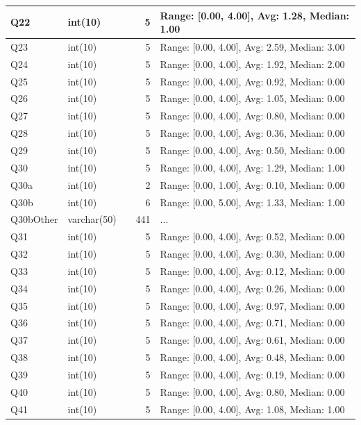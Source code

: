 \begin{landscape}
\begin{longtable}{|l|l|l|r|p{6cm}|}
\hline
Q22 & int(10) &  & 5 & Range: [0.00, 4.00], Avg: 1.28, Median: 1.00 \\
\hline
Q23 & int(10) &  & 5 & Range: [0.00, 4.00], Avg: 2.59, Median: 3.00 \\
\hline
Q24 & int(10) &  & 5 & Range: [0.00, 4.00], Avg: 1.92, Median: 2.00 \\
\hline
Q25 & int(10) &  & 5 & Range: [0.00, 4.00], Avg: 0.92, Median: 0.00 \\
\hline
Q26 & int(10) &  & 5 & Range: [0.00, 4.00], Avg: 1.05, Median: 0.00 \\
\hline
Q27 & int(10) &  & 5 & Range: [0.00, 4.00], Avg: 0.80, Median: 0.00 \\
\hline
Q28 & int(10) &  & 5 & Range: [0.00, 4.00], Avg: 0.36, Median: 0.00 \\
\hline
Q29 & int(10) &  & 5 & Range: [0.00, 4.00], Avg: 0.50, Median: 0.00 \\
\hline
Q30 & int(10) &  & 5 & Range: [0.00, 4.00], Avg: 1.29, Median: 1.00 \\
\hline
Q30a & int(10) &  & 2 & Range: [0.00, 1.00], Avg: 0.10, Median: 0.00 \\
\hline
Q30b & int(10) &  & 6 & Range: [0.00, 5.00], Avg: 1.33, Median: 1.00 \\
\hline
Q30bOther & varchar(50) &  & 441 & ... \\
\hline
Q31 & int(10) &  & 5 & Range: [0.00, 4.00], Avg: 0.52, Median: 0.00 \\
\hline
Q32 & int(10) &  & 5 & Range: [0.00, 4.00], Avg: 0.30, Median: 0.00 \\
\hline
Q33 & int(10) &  & 5 & Range: [0.00, 4.00], Avg: 0.12, Median: 0.00 \\
\hline
Q34 & int(10) &  & 5 & Range: [0.00, 4.00], Avg: 0.26, Median: 0.00 \\
\hline
Q35 & int(10) &  & 5 & Range: [0.00, 4.00], Avg: 0.97, Median: 0.00 \\
\hline
Q36 & int(10) &  & 5 & Range: [0.00, 4.00], Avg: 0.71, Median: 0.00 \\
\hline
Q37 & int(10) &  & 5 & Range: [0.00, 4.00], Avg: 0.61, Median: 0.00 \\
\hline
Q38 & int(10) &  & 5 & Range: [0.00, 4.00], Avg: 0.48, Median: 0.00 \\
\hline
Q39 & int(10) &  & 5 & Range: [0.00, 4.00], Avg: 0.19, Median: 0.00 \\
\hline
Q40 & int(10) &  & 5 & Range: [0.00, 4.00], Avg: 0.80, Median: 0.00 \\
\hline
Q41 & int(10) &  & 5 & Range: [0.00, 4.00], Avg: 1.08, Median: 1.00 \\

\end{longtable}
\end{landscape}
